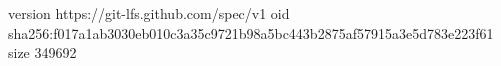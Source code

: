 version https://git-lfs.github.com/spec/v1
oid sha256:f017a1ab3030eb010c3a35c9721b98a5bc443b2875af57915a3e5d783e223f61
size 349692
